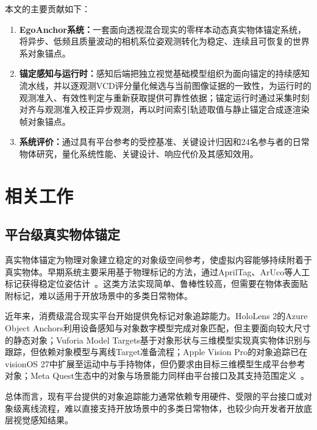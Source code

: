 \documentclass[review]{vgtc}
\begin{document}
本文的主要贡献如下：

\begin{enumerate}
  \item \textbf{EgoAnchor系统：}一套面向透视混合现实的零样本动态真实物体锚定系统，将异步、低频且质量波动的相机系位姿观测转化为稳定、连续且可恢复的世界系对象锚点。

  \item \textbf{锚定感知与运行时：}感知后端把独立视觉基础模型组织为面向锚定的持续感知流水线，并以逐观测VCD评分量化候选与当前图像证据的一致性，为运行时的观测准入、有效性判定与重新获取提供可靠性依据；锚定运行时通过采集时刻对齐与观测准入校正异步观测，再以时间索引轨迹取值与静止锚定合成逐渲染帧对象锚点。

  \item \textbf{系统评价：}通过具有平台参考的受控基准、关键设计归因和24名参与者的日常物体研究，量化系统性能、关键设计、响应代价及其感知效用。
\end{enumerate}

\section{相关工作}\label{sec:related-work}

\subsection{平台级真实物体锚定}

真实物体锚定为物理对象建立稳定的对象级空间参考，使虚拟内容能够持续附着于真实物体。早期系统主要采用基于物理标记的方法，通过AprilTag、ArUco等人工标记获得稳定位姿估计~\cite{kato1999artoolkit,olson2011apriltag,garridojurado2014aruco}。这类方法实现简单、鲁棒性较高，但需要在物体表面贴附标记，难以适用于开放场景中的多类日常物体。

近年来，消费级混合现实平台开始提供免标记对象追踪能力。HoloLens 2的Azure Object Anchors利用设备感知与对象数字模型完成对象匹配，但主要面向较大尺寸的静态对象；Vuforia Model Targets基于对象形状与三维模型实现真实物体识别与跟踪，但依赖对象模型与离线Target准备流程；Apple Vision Pro的对象追踪已在visionOS 27中扩展至运动中与手持物体，但仍要求由目标三维模型生成平台参考对象；Meta Quest生态中的对象与场景能力同样由平台接口及其支持范围定义~\cite{appleObjectAnchor,appleObjectTracking2026,azureObjectAnchors,vuforiaModelTargets,metaDynamicObjectTracker}。

总体而言，现有平台提供的对象追踪能力通常依赖专用硬件、受限的平台接口或对象级离线流程，难以直接支持开放场景中的多类日常物体，也较少向开发者开放底层视觉感知结果。
\end{document}
